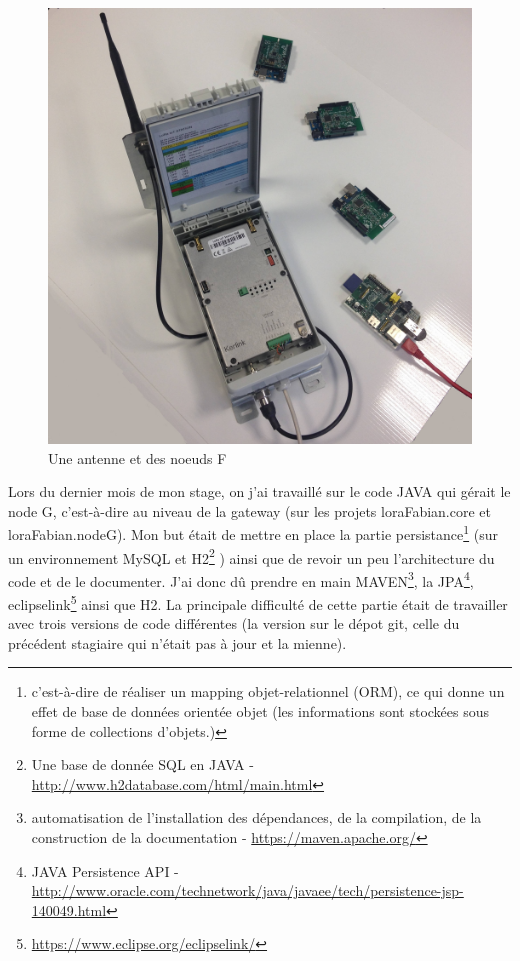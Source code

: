 \documentclass{article}
\begin{document}
\begin{figure}[h]
	\begin{center}
		\includegraphics[scale=0.09]{../res/img/antennaNodeF}
		\caption{Une antenne et des noeuds F}
		\label{fig:matoslora}
	\end{center}
\end{figure}

Lors du dernier mois de mon stage, on j'ai travaillé sur le code JAVA qui gérait le node G, c’est-à-dire au niveau de la gateway (sur les projets loraFabian.core et loraFabian.nodeG). Mon but était de mettre en place la partie persistance\footnote{c'est-à-dire de réaliser un mapping objet-relationnel (ORM), ce qui donne un effet de base de données orientée objet (les informations sont stockées sous forme de collections d'objets.)} (sur un environnement MySQL et H2\footnote{Une base de donnée SQL en JAVA - \url{http://www.h2database.com/html/main.html}} ) ainsi que de revoir un peu l’architecture du code et de le documenter. J’ai donc dû prendre en main MAVEN\footnote{automatisation de l'installation des dépendances, de la compilation, de la construction de la documentation - \url{https://maven.apache.org/}}, la JPA\footnote{JAVA Persistence API - \url{http://www.oracle.com/technetwork/java/javaee/tech/persistence-jsp-140049.html}}, eclipselink\footnote{\url{https://www.eclipse.org/eclipselink/}} ainsi que H2. La principale difficulté de cette partie était de travailler avec trois versions de code différentes (la version sur le dépot git, celle du précédent stagiaire qui n’était pas à jour et la mienne).
\end{document}
